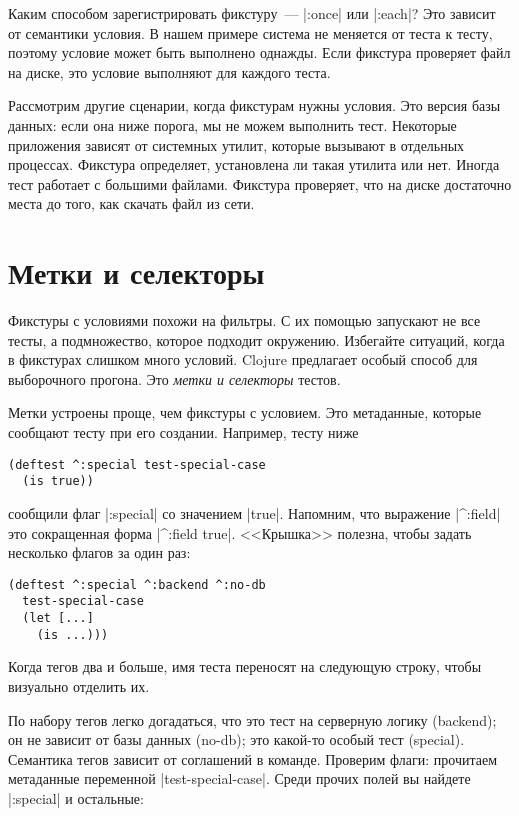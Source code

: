 Каким способом зарегистрировать фикстуру~--- \spverb|:once| или \spverb|:each|?
Это зависит от семантики условия. В нашем примере система не меняется от теста к
тесту, поэтому условие может быть выполнено однажды. Если фикстура проверяет
файл на диске, это условие выполняют для каждого теста.

Рассмотрим другие сценарии, когда фикстурам нужны условия. Это версия базы
данных: если она ниже порога, мы не можем выполнить тест. Некоторые приложения
зависят от системных утилит, которые вызывают в отдельных процессах. Фикстура
определяет, установлена ли такая утилита или нет. Иногда тест работает с
большими файлами. Фикстура проверяет, что на диске достаточно места до того, как
скачать файл из сети.

\section{Метки и селекторы}

Фикстуры с условиями похожи на фильтры. С их помощью запускают не все тесты, а
подмножество, которое подходит окружению. Избегайте ситуаций, когда в фикстурах
слишком много условий. Clojure предлагает особый способ для выборочного
прогона. Это \emph{метки и селекторы} тестов.

Метки устроены проще, чем фикстуры с условием. Это метаданные, которые сообщают
тесту при его создании. Например, тесту ниже

\begin{verbatim}
(deftest ^:special test-special-case
  (is true))
\end{verbatim}

\noindent
сообщили флаг \spverb|:special| со значением \spverb|true|. Напомним, что
выражение \spverb|^:field| это сокращенная форма \spverb|^{:field true}|.
<<Крышка>> полезна, чтобы задать несколько флагов за один раз:

\begin{verbatim}
(deftest ^:special ^:backend ^:no-db
  test-special-case
  (let [...]
    (is ...)))
\end{verbatim}

Когда тегов два и больше, имя теста переносят на следующую строку, чтобы
визуально отделить их.

По набору тегов легко догадаться, что это тест на серверную логику (backend); он
не зависит от базы данных (no-db); это какой-то особый тест (special). Семантика
тегов зависит от соглашений в команде. Проверим флаги: прочитаем метаданные
переменной \spverb|test-special-case|. Среди прочих полей вы найдете
\spverb|:special| и остальные:

